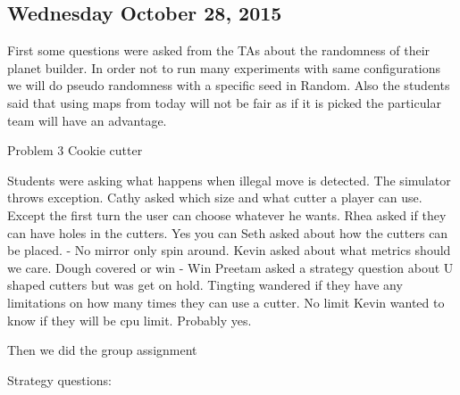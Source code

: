 \subsection{Wednesday October 28, 2015}
First some questions were asked from the TAs about the randomness of their planet builder.
In order not to run many experiments with same configurations we will do pseudo randomness with a specific seed in Random. 
Also the students said that using maps from today will not be fair as if it is picked the particular team will have an advantage.

Problem 3 Cookie cutter

Students were asking what happens when illegal move is detected.
The simulator throws exception.
Cathy asked which size and what cutter a player can use.
Except the first turn the user can choose whatever he wants.
Rhea asked if they can have holes in the cutters. Yes you can
Seth asked about how the cutters can be placed. - No mirror only spin around.
Kevin asked about what metrics should we care. Dough covered or win - Win
Preetam asked a strategy question about U shaped cutters but was get on hold.
Tingting wandered if they have any limitations on how many times they can use a cutter. No limit
Kevin wanted to know if they will be cpu limit. Probably yes.

Then we did the group assignment 

Strategy questions:

